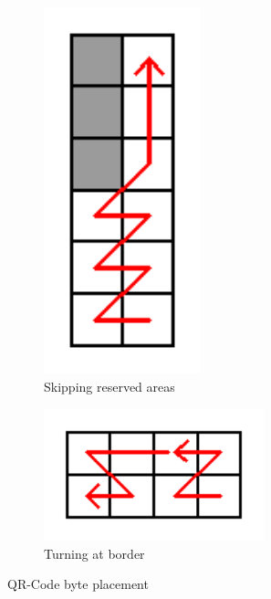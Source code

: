 \begin{figure}[H]
\begin{subfigure}{0.3\textwidth}
  \end{subfigure}
  \begin{subfigure}{0.3\textwidth}
    \centering
    \includegraphics[width=0.5\textwidth]{images/qr_plcmt_reserved}
    \caption{Skipping reserved areas}
    \label{fig:qr_plcmt_reserved}
  \end{subfigure}
  \begin{subfigure}{0.3\textwidth}
    \centering
    \includegraphics[width=0.7\textwidth]{images/qr_plcmt_turning}
    \caption{Turning at border}
    \label{fig:qr_plcmt_turning}
  \end{subfigure}
  \caption{QR-Code byte placement}
  \label{fig:qr_plcmt_byte}
\end{figure}

